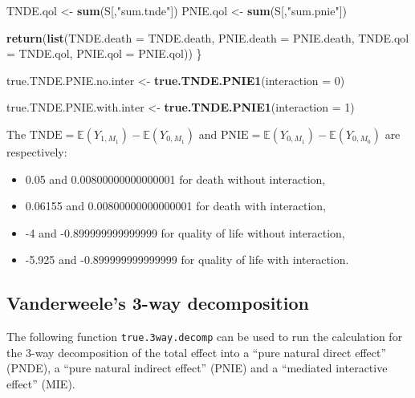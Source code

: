 \documentclass[
]{book}
\newenvironment{Shaded}{\begin{snugshade}}{\end{snugshade}}
\newcommand{\AttributeTok}[1]{\textcolor[rgb]{0.13,0.29,0.53}{#1}}
\newcommand{\DecValTok}[1]{\textcolor[rgb]{0.00,0.00,0.81}{#1}}
\newcommand{\FunctionTok}[1]{\textcolor[rgb]{0.13,0.29,0.53}{\textbf{#1}}}
\newcommand{\NormalTok}[1]{#1}
\newcommand{\OtherTok}[1]{\textcolor[rgb]{0.56,0.35,0.01}{#1}}
\newcommand{\StringTok}[1]{\textcolor[rgb]{0.31,0.60,0.02}{#1}}
\providecommand{\tightlist}{%
  \setlength{\itemsep}{0pt}\setlength{\parskip}{0pt}}
\begin{document}
\begin{Shaded}
\begin{Highlighting}[]
\NormalTok{  TNDE.qol }\OtherTok{\textless{}{-}} \FunctionTok{sum}\NormalTok{(S[,}\StringTok{"sum.tnde"}\NormalTok{])}
\NormalTok{  PNIE.qol }\OtherTok{\textless{}{-}} \FunctionTok{sum}\NormalTok{(S[,}\StringTok{"sum.pnie"}\NormalTok{])}
   
  \FunctionTok{return}\NormalTok{(}\FunctionTok{list}\NormalTok{(}\AttributeTok{TNDE.death =}\NormalTok{ TNDE.death, }\AttributeTok{PNIE.death =}\NormalTok{ PNIE.death, }
              \AttributeTok{TNDE.qol =}\NormalTok{ TNDE.qol, }\AttributeTok{PNIE.qol =}\NormalTok{ PNIE.qol))}
\NormalTok{\}}
\end{Highlighting}
\end{Shaded}

\begin{Shaded}
\begin{Highlighting}[]
\NormalTok{true.TNDE.PNIE.no.inter }\OtherTok{\textless{}{-}} \FunctionTok{true.TNDE.PNIE1}\NormalTok{(}\AttributeTok{interaction =} \DecValTok{0}\NormalTok{)}

\NormalTok{true.TNDE.PNIE.with.inter }\OtherTok{\textless{}{-}} \FunctionTok{true.TNDE.PNIE1}\NormalTok{(}\AttributeTok{interaction =} \DecValTok{1}\NormalTok{)}
\end{Highlighting}
\end{Shaded}

The \(\text{TNDE}=\mathbb{E}\left( Y_{1,M_1}\right) - \mathbb{E}\left(Y_{0,M_1}\right)\) and \(\text{PNIE}=\mathbb{E}\left( Y_{0,M_1}\right) - \mathbb{E}\left(Y_{0,M_0}\right)\) are respectively:

\begin{itemize}
\tightlist
\item
  0.05 and 0.00800000000000001 for death without interaction,
\item
  0.06155 and 0.00800000000000001 for death with interaction,
\item
  -4 and -0.899999999999999 for quality of life without interaction,
\item
  -5.925 and -0.899999999999999 for quality of life with interaction.
\end{itemize}

\subsection{Vanderweele's 3-way decomposition}\label{vanderweeles-3-way-decomposition}

The following function \texttt{true.3way.decomp} can be used to run the calculation for the 3-way decomposition of the total effect into a ``pure natural direct effect'' (PNDE), a ``pure natural indirect effect'' (PNIE) and a ``mediated interactive effect'' (MIE).
\end{document}
